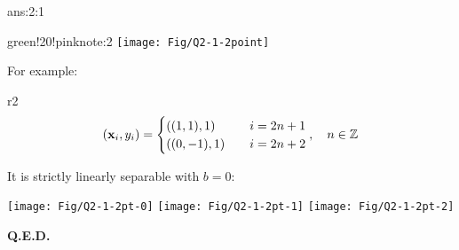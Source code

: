 \documentclass{tron}
\begin{document}
\begin{answer}{ans:2:1}
\begin{note}{green!20!pink}{note:2}
	\texttt{[image: Fig/Q2-1-2point]}

	For example:
	\begin{remark}{r2}
	\begin{equation}
		(\mathbf{x}_{i}, y_{i}) =
		\begin{cases}
				((1,1), 1)  \quad & i= 2n + 1\\
				((0 , -1), 1) \quad & i= 2n + 2 \\
		\end{cases}
		,\quad n \in \mathbb{Z}
	\end{equation}
	\end{remark}
	
	It is strictly linearly separable with $b=0$:
	
	\texttt{[image: Fig/Q2-1-2pt-0]}
	\texttt{[image: Fig/Q2-1-2pt-1]}
	\texttt{[image: Fig/Q2-1-2pt-2]}

	\end{note}

	\textbf{Q.E.D.}
\end{answer}
\end{document}
